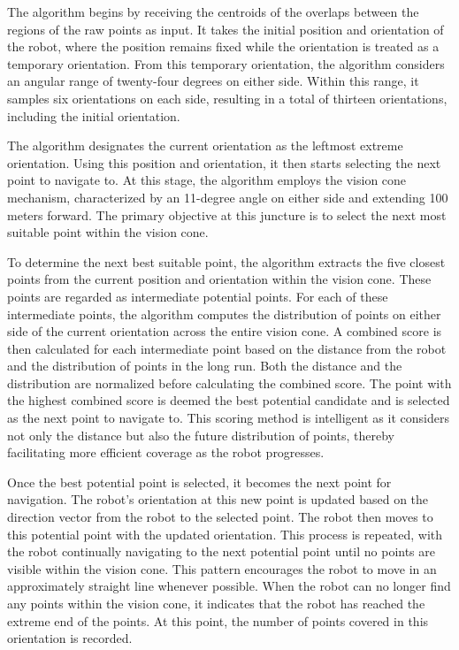         
\vspace*{6mm}  
 
The algorithm begins by receiving the centroids of the overlaps between the regions of the raw points as input. It takes the initial position and orientation of the robot, where the position remains fixed while the orientation is treated as a temporary orientation. From this temporary orientation, the algorithm considers an angular range of twenty-four degrees on either side. Within this range, it samples six orientations on each side, resulting in a total of thirteen orientations, including the initial orientation.

\vspace*{6mm}  

The algorithm designates the current orientation as the leftmost extreme orientation. Using this position and orientation, it then starts selecting the next point to navigate to. At this stage, the algorithm employs the vision cone mechanism, characterized by an 11-degree angle on either side and extending 100 meters forward. The primary objective at this juncture is to select the next most suitable point within the vision cone.

\vspace*{6mm}  

To determine the next best suitable point, the algorithm extracts the five closest points from the current position and orientation within the vision cone. These points are regarded as intermediate potential points. For each of these intermediate points, the algorithm computes the distribution of points on either side of the current orientation across the entire vision cone. A combined score is then calculated for each intermediate point based on the distance from the robot and the distribution of points in the long run. Both the distance and the distribution are normalized before calculating the combined score. The point with the highest combined score is deemed the best potential candidate and is selected as the next point to navigate to. This scoring method is intelligent as it considers not only the distance but also the future distribution of points, thereby facilitating more efficient coverage as the robot progresses.

\vspace*{6mm}  

Once the best potential point is selected, it becomes the next point for navigation. The robot's orientation at this new point is updated based on the direction vector from the robot to the selected point. The robot then moves to this potential point with the updated orientation. This process is repeated, with the robot continually navigating to the next potential point until no points are visible within the vision cone. This pattern encourages the robot to move in an approximately straight line whenever possible. When the robot can no longer find any points within the vision cone, it indicates that the robot has reached the extreme end of the points. At this point, the number of points covered in this orientation is recorded.

